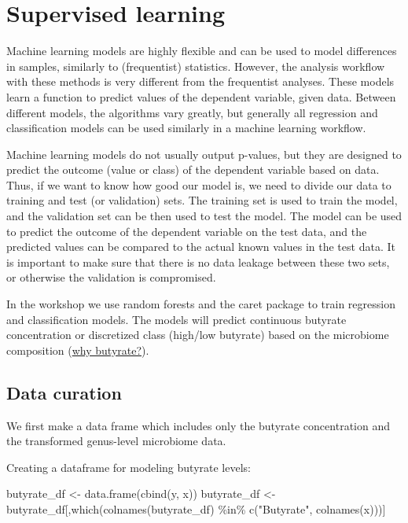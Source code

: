 \documentclass[
  oneside]{book}
\newenvironment{Shaded}{\begin{snugshade}}{\end{snugshade}}
\newcommand{\FunctionTok}[1]{\textcolor[rgb]{0.00,0.00,0.00}{#1}}
\newcommand{\NormalTok}[1]{#1}
\newcommand{\OtherTok}[1]{\textcolor[rgb]{0.56,0.35,0.01}{#1}}
\newcommand{\SpecialCharTok}[1]{\textcolor[rgb]{0.00,0.00,0.00}{#1}}
\newcommand{\StringTok}[1]{\textcolor[rgb]{0.31,0.60,0.02}{#1}}
\begin{document}
\hypertarget{supervised-learning}{%
\chapter{Supervised learning}\label{supervised-learning}}

Machine learning models are highly flexible and can be used to model differences in
samples, similarly to (frequentist) statistics. However, the analysis workflow with
these methods is very different from the frequentist analyses. These models learn
a function to predict values of the dependent variable, given data. Between different
models, the algorithms vary greatly, but generally all regression and classification
models can be used similarly in a machine learning workflow.

Machine learning models do not usually output p-values, but they are designed to
predict the outcome (value or class) of the dependent variable based on data.
Thus, if we want to know how good our model is, we need to divide our data to training
and test (or validation) sets. The training set is used to train the model, and the
validation set can be then used to test the model. The model can be used to predict
the outcome of the dependent variable on the test data, and the predicted values can
be compared to the actual known values in the test data. It is important to make sure
that there is no data leakage between these two sets, or otherwise the validation is
compromised.

In the workshop we use random forests and the caret package to train regression and
classification models. The models will predict continuous butyrate concentration or discretized
class (high/low butyrate) based on the microbiome composition (\href{https://scholar.google.com/scholar?as_sdt=0\%2C5\&as_ylo=2015\&q=butyrate+and+gut+microbiome\&btnG=}{why butyrate?}).

\hypertarget{data-curation}{%
\section{Data curation}\label{data-curation}}

We first make a data frame which includes only the butyrate concentration and the
transformed genus-level microbiome data.

Creating a dataframe for modeling butyrate levels:

\begin{Shaded}
\begin{Highlighting}[]
\NormalTok{butyrate\_df }\OtherTok{\textless{}{-}} \FunctionTok{data.frame}\NormalTok{(}\FunctionTok{cbind}\NormalTok{(y, x))}
\NormalTok{butyrate\_df }\OtherTok{\textless{}{-}}\NormalTok{ butyrate\_df[,}\FunctionTok{which}\NormalTok{(}\FunctionTok{colnames}\NormalTok{(butyrate\_df) }\SpecialCharTok{\%in\%} \FunctionTok{c}\NormalTok{(}\StringTok{"Butyrate"}\NormalTok{, }\FunctionTok{colnames}\NormalTok{(x)))]}
\end{Highlighting}
\end{Shaded}
\end{document}
